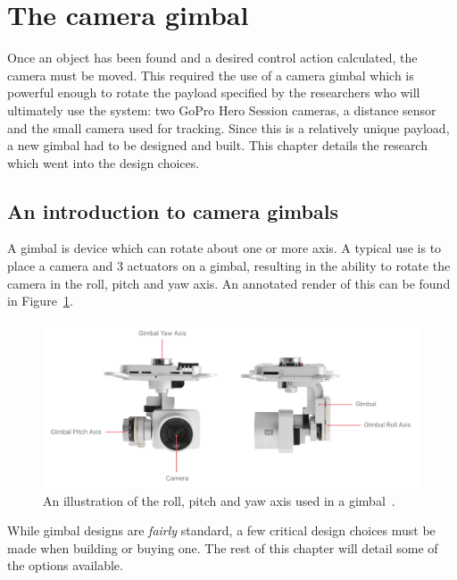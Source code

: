 \section{The camera gimbal}
Once an object has been found and a desired control action calculated, the camera must be moved. This required the use of a camera gimbal which is powerful enough to rotate the payload specified by the researchers who will ultimately use the system: two GoPro Hero Session cameras, a distance sensor and the small camera used for tracking. Since this is a relatively unique payload, a new gimbal had to be designed and built. This chapter details the research which went into the design choices.

\subsection{An introduction to camera gimbals}
A gimbal is device which can rotate about one or more axis. A typical use is to place a camera and 3 actuators on a gimbal, resulting in the ability to rotate the camera in the roll, pitch and yaw axis. An annotated render of this can be found in Figure~\ref{fig:roll_pitch_yaw_camera}.

\begin{figure}[h!]
  \centering
  \includegraphics[width=\textwidth]{literature_review/roll_pitch_yaw_gimbal.png}
  \caption{\label{fig:roll_pitch_yaw_camera} An illustration of the roll, pitch and yaw axis used in a gimbal~\cite{roll_pitch_yaw_camera}.}
\end{figure}

While gimbal designs are \emph{fairly} standard, a few critical design choices must be made when building or buying one. The rest of this chapter will detail some of the options available.

